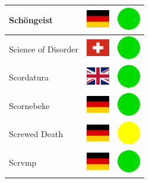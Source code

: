 \documentclass[12pt, a4paper, twoside]{report}
\begin{document}
\begin{center}
\begin{longtable}{|p{5cm}|p{2cm}|p{2cm}|}
 Schöngeist                                                 & \includegraphics[width=1cm]{../img/flags/de} &   \includegraphics[width=1cm]{../likes/y} \\ \hline
 Science of Disorder                                        & \includegraphics[width=1cm]{../img/flags/ch} &   \includegraphics[width=1cm]{../likes/y} \\ \hline
 Scordatura                                                 & \includegraphics[width=1cm]{../img/flags/gb} &   \includegraphics[width=1cm]{../likes/y} \\ \hline
 Scornebeke                                                 & \includegraphics[width=1cm]{../img/flags/de} &   \includegraphics[width=1cm]{../likes/y} \\ \hline
 Screwed Death                                              & \includegraphics[width=1cm]{../img/flags/de} &   \includegraphics[width=1cm]{../likes/m} \\ \hline
 Scrvmp                                                     & \includegraphics[width=1cm]{../img/flags/de} &   \includegraphics[width=1cm]{../likes/y} \\ \hline

\end{longtable}
\end{center}
\end{document}
